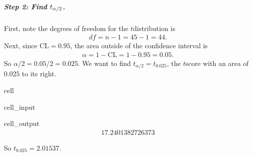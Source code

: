 \documentclass[letterpaper,10pt,english]{jupyterBook}
\begin{document}
\subparagraph{Step 2: Find \protect\(t_{\alpha/2}\protect\).}
\label{\detokenize{Ch5 Confidence Intervals/5.4 Estimating Population Means (Sigma Unknown):step-2-find-t-alpha-2}}
\sphinxAtStartPar
First, note the degrees of freedom for the \(t\)\sphinxhyphen{}distribution is
\begin{equation*}
\begin{split} df = n-1 = 45 - 1 = 44. \end{split}
\end{equation*}
\sphinxAtStartPar
Next, since \(\text{CL} = 0.95\), the area outside of the confidence interval is
\begin{equation*}
\begin{split} \alpha = 1 - \text{CL} = 1 - 0.95 = 0.05. \end{split}
\end{equation*}
\sphinxAtStartPar
So \(\alpha/2 = 0.05/2 = 0.025\). We want to find \(t_{\alpha/2} = t_{0.025}\), the \(t\)\sphinxhyphen{}score with an area of \(0.025\) to its right.

\begin{sphinxuseclass}{cell}\begin{sphinxVerbatimInput}

\begin{sphinxuseclass}{cell_input}
\begin{sphinxVerbatim}[commandchars=\\\{\}]
\end{sphinxVerbatim}

\end{sphinxuseclass}\end{sphinxVerbatimInput}
\begin{sphinxVerbatimOutput}

\begin{sphinxuseclass}{cell_output}\begin{equation*}
\begin{split}17.2401382726373\end{split}
\end{equation*}
\end{sphinxuseclass}\end{sphinxVerbatimOutput}

\end{sphinxuseclass}
\sphinxAtStartPar
So \(t_{0.025} = 2.01537\).
\end{document}
